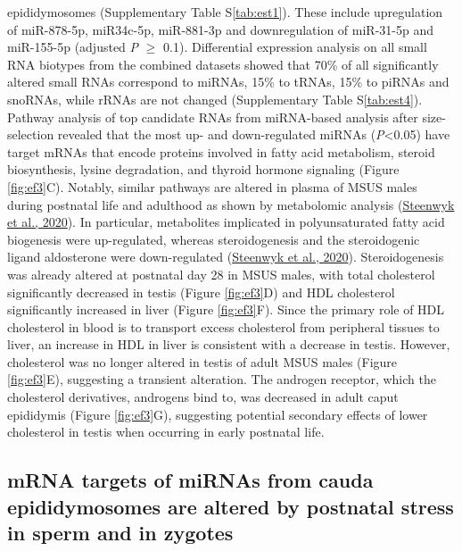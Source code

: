 \documentclass[12pt,twoside]{reedthesis}
\begin{document}
epididymosomes (Supplementary Table S\ref{tab:est1}). These include upregulation of
miR-878-5p, miR34c-5p, miR-881-3p and downregulation of miR-31-5p and
miR-155-5p (adjusted \emph{P} \(\geq\) 0.1). Differential expression analysis
on all small RNA biotypes from the combined datasets showed that 70\% of
all significantly altered small RNAs correspond to miRNAs, 15\% to tRNAs,
15\% to piRNAs and snoRNAs, while rRNAs are not changed (Supplementary
Table S\ref{tab:est4}). Pathway analysis of top candidate RNAs from miRNA-based
analysis after size-selection revealed that the most up- and
down-regulated miRNAs (\emph{P}\textless0.05) have target mRNAs that encode proteins
involved in fatty acid metabolism, steroid biosynthesis, lysine
degradation, and thyroid hormone signaling (Figure \ref{fig:ef3}C). Notably,
similar pathways are altered in plasma of MSUS males during postnatal
life and adulthood as shown by metabolomic analysis (\protect\hyperlink{ref-vansteenwyk_2020}{Steenwyk et al., 2020}). In
particular, metabolites implicated in polyunsaturated fatty acid
biogenesis were up-regulated, whereas steroidogenesis and the
steroidogenic ligand aldosterone were down-regulated (\protect\hyperlink{ref-vansteenwyk_2020}{Steenwyk et al., 2020}).
Steroidogenesis was already altered at postnatal day 28 in MSUS males,
with total cholesterol significantly decreased in testis (Figure \ref{fig:ef3}D)
and HDL cholesterol significantly increased in liver (Figure \ref{fig:ef3}F).
Since the primary role of HDL cholesterol in blood is to transport
excess cholesterol from peripheral tissues to liver, an increase in HDL
in liver is consistent with a decrease in testis. However, cholesterol
was no longer altered in testis of adult MSUS males (Figure \ref{fig:ef3}E),
suggesting a transient alteration. The androgen receptor, which the
cholesterol derivatives, androgens bind to, was decreased in adult caput
epididymis (Figure \ref{fig:ef3}G), suggesting potential secondary effects of
lower cholesterol in testis when occurring in early postnatal life.

\hypertarget{mrna-targets-of-mirnas-from-cauda-epididymosomes-are-altered-by-postnatal-stress-in-sperm-and-in-zygotes}{%
\subsection{mRNA targets of miRNAs from cauda epididymosomes are altered by postnatal stress in sperm and in zygotes}\label{mrna-targets-of-mirnas-from-cauda-epididymosomes-are-altered-by-postnatal-stress-in-sperm-and-in-zygotes}}
\end{document}
